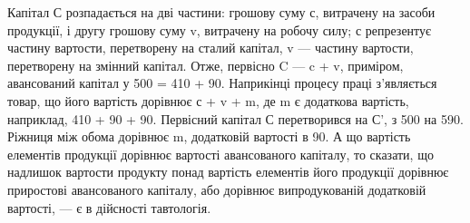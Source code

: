 Капітал С розпадається на дві частини: грошову суму с, витрачену на засоби продукції, і другу
грошову суму v, витрачену на робочу силу; с репрезентує частину вартости, перетворену на сталий
капітал, v — частину вартости, перетворену на змінний капітал. Отже, первісно C — c + v, приміром,
авансований капітал у 500 = 410 + 90.
Наприкінці процесу праці з’являється товар, що його вартість дорівнює с + v + m, де m є додаткова
вартість, наприклад, 410 + 90 + 90. Первісний
капітал С перетворився на С',
з 500 на 590. Ріжниця між обома дорівнює m, додатковій вартості
в 90. А що вартість елементів продукції дорівнює вартості авансованого капіталу, то сказати, що
надлишок вартости продукту понад вартість елементів його продукції дорівнює приростові авансованого
капіталу, або дорівнює випродукованій додатковій вартості, — є в дійсності тавтологія.

